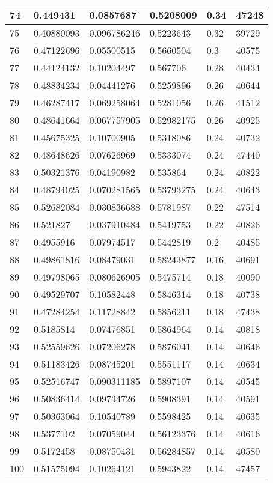 \begin{longtable}{|l|l|l|l|l|l|}
74 & 0.449431 & 0.0857687 & 0.5208009 & 0.34 & 47248 \\ \hline 
75 & 0.40880093 & 0.096786246 & 0.5223643 & 0.32 & 39729 \\ \hline 
76 & 0.47122696 & 0.05500515 & 0.5660504 & 0.3 & 40575 \\ \hline 
77 & 0.44124132 & 0.10204497 & 0.567706 & 0.28 & 40434 \\ \hline 
78 & 0.48834234 & 0.04441276 & 0.5259896 & 0.26 & 40644 \\ \hline 
79 & 0.46287417 & 0.069258064 & 0.5281056 & 0.26 & 41512 \\ \hline 
80 & 0.48641664 & 0.067757905 & 0.52982175 & 0.26 & 40925 \\ \hline 
81 & 0.45675325 & 0.10700905 & 0.5318086 & 0.24 & 40732 \\ \hline 
82 & 0.48648626 & 0.07626969 & 0.5333074 & 0.24 & 47440 \\ \hline 
83 & 0.50321376 & 0.04190982 & 0.535864 & 0.24 & 40822 \\ \hline 
84 & 0.48794025 & 0.070281565 & 0.53793275 & 0.24 & 40643 \\ \hline 
85 & 0.52682084 & 0.030836688 & 0.5781987 & 0.22 & 47514 \\ \hline 
86 & 0.521827 & 0.037910484 & 0.5419753 & 0.22 & 40826 \\ \hline 
87 & 0.4955916 & 0.07974517 & 0.5442819 & 0.2 & 40485 \\ \hline 
88 & 0.49861816 & 0.08479031 & 0.58243877 & 0.16 & 40691 \\ \hline 
89 & 0.49798065 & 0.080626905 & 0.5475714 & 0.18 & 40090 \\ \hline 
90 & 0.49529707 & 0.10582448 & 0.5846314 & 0.18 & 40738 \\ \hline 
91 & 0.47284254 & 0.11728842 & 0.5856211 & 0.18 & 47438 \\ \hline 
92 & 0.5185814 & 0.07476851 & 0.5864964 & 0.14 & 40818 \\ \hline 
93 & 0.52559626 & 0.07206278 & 0.5876041 & 0.14 & 40646 \\ \hline 
94 & 0.51183426 & 0.08745201 & 0.5551117 & 0.14 & 40634 \\ \hline 
95 & 0.52516747 & 0.090311185 & 0.5897107 & 0.14 & 40545 \\ \hline 
96 & 0.50836414 & 0.09734726 & 0.5908391 & 0.14 & 40591 \\ \hline 
97 & 0.50363064 & 0.10540789 & 0.5598425 & 0.14 & 40635 \\ \hline 
98 & 0.5377102 & 0.07059044 & 0.56123376 & 0.14 & 40616 \\ \hline 
99 & 0.5172458 & 0.08750431 & 0.56284857 & 0.14 & 40580 \\ \hline 
100 & 0.51575094 & 0.10264121 & 0.5943822 & 0.14 & 47457 \\ \hline 
\end{longtable}